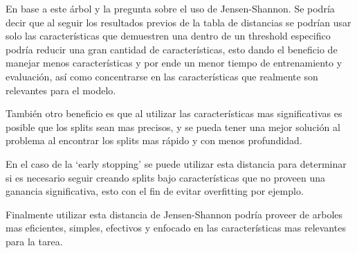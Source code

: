 \documentclass[12pt,a4paper]{article}
\begin{document}
En base a este árbol y la pregunta sobre el uso de Jensen-Shannon.
Se podría decir que al seguir los resultados previos de la tabla de distancias se podrían usar solo las
características que demuestren una dentro de un threshold especifico podría reducir una gran cantidad de características,
esto dando el beneficio de manejar menos características y por ende un menor tiempo de entrenamiento y evaluación, así como
concentrarse en las características que realmente son relevantes para el modelo.

También otro beneficio es que al utilizar las características mas significativas es posible que los splits sean mas precisos,
y se pueda tener una mejor solución al problema al encontrar los splits mas rápido y con menos profundidad.

En el caso de la `early stopping' se puede utilizar esta distancia para determinar si es necesario seguir creando splits bajo características
que no proveen una ganancia significativa, esto con el fin de evitar overfitting por ejemplo.

Finalmente utilizar esta distancia de Jensen-Shannon podría proveer de arboles mas eficientes, simples, efectivos y enfocado
en las características mas relevantes para la tarea.
\end{document}
